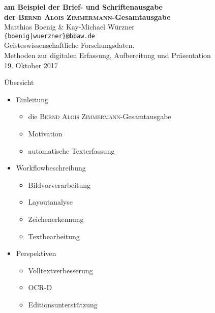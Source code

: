 \documentclass{bbawslides}
\begin{document}
\providecommand{\Title}{}


\begin{bbawtitle}
  \vspace*{0.5em}%
  \textcolor{bbawred}{\bf am Beispiel der Brief- und Schriftenausgabe\\der \textsc{Bernd Alois Zimmermann}-Gesamtausgabe}\\[4ex]
  Matthias Boenig \& Kay-Michael Würzner\\[-.25em]%
  \textcolor{urlColor}{\texttt{{\small \{boenig|wuerzner\}@bbaw.de}}}
  \\[1.5em]
  {\scriptsize{%
    Geisteswissenschaftliche Forschungsdaten.\\Methoden zur digitalen Erfassung, Aufbereitung und Präsentation\\%
    19. Oktober 2017\\%
  }}
\end{bbawtitle}
\slideStyleFrame

\renewcommand{\footerText}{\tiny 19. Oktober 2017, Workshop AG eHumanities}

\begin{bbawslide}{Übersicht}
  \vspace*{7mm}%
  \centerslidestrue%
  \begin{itemize}
    \item Einleitung
    \begin{itemize}\small
      \item die \textsc{Bernd Alois Zimmermann}-Gesamtausgabe
      \item Motivation
      \item automatische Texterfassung
    \end{itemize}
    \item Workflowbeschreibung
    \begin{itemize}\small
      \item Bildvorverarbeitung
      \item Layoutanalyse
      \item Zeichenerkennung
      \item Textbearbeitung
    \end{itemize}
    \item Perspektiven
    \begin{itemize}\small
      \item Volltextverbesserung
      \item OCR-D
      \item Editionsunterstützung
    \end{itemize}
  \end{itemize}
\end{bbawslide}
\end{document}

